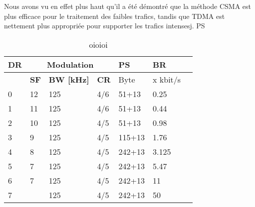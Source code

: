 \cite{_evaluation_} Nous avons vu en effet plus haut qu’il a été démontré que la méthode CSMA est plus efficace pour le traitement des faibles trafics,
	tandis que TDMA est nettement plus appropriée pour supporter les trafics intensesj.
\ac{PS}



\begin{table}[h!]
\scriptsize
	\begin{tabular}{l|l|l|l|l|l|l}
	\textbf{\ac{DR}}  & \multicolumn{3}{c|}{\textbf{Modulation}}													& \ac{PS}						    & \textbf{\ac{BR}}  \\\hline
	\                 & \textbf{\ac{SF}}                          	& \textbf{\ac{BW} [kHz]} 	& \textbf{\ac{CR}}  & Byte						 		& x kbit/s 			\\\hline
	0                 & 12                                        	& 125               		& 4/6         		& 51+13                   			& 0.25     			\\\hline
	1                 & 11                                        	& 125               		& 4/6         		& 51+13                   			& 0.44     			\\\hline
	2                 & 10                                        	& 125               		& 4/5         		& 51+13                   			& 0.98     			\\\hline
	3                 & 9                                         	& 125               		& 4/5         		& 115+13                  			& 1.76     			\\\hline
	4                 & 8                                         	& 125               		& 4/5         		& 242+13                  			& 3.125    			\\\hline
	5                 & 7                                         	& 125               		& 4/5         		& 242+13                 			& 5.47     			\\\hline
	6                 & 7                                         	& 125               		& 4/5         		& 242+13                 			& 11       			\\\hline
	7                 &                                           	& 125               		& 4/5         		& 242+13                 			& 50       			\\\hline
	\end{tabular}
\caption{\label{tab:llo}oioioi }
\end{table}

\clearpage
\newpage
\setlength{\hoffset}{-0in}
